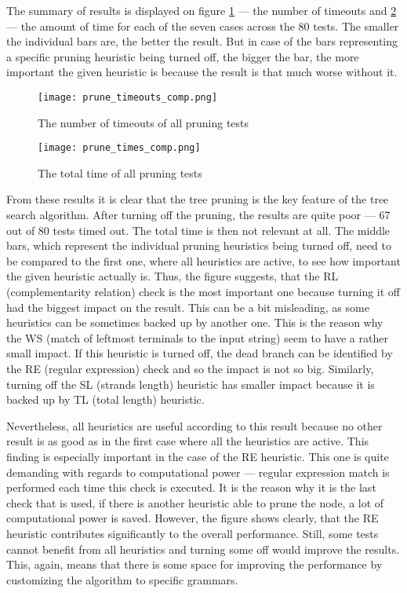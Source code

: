 The summary of results is displayed on figure \ref{fig:prune_timeouts_comp} --- the number of timeouts and \ref{fig:prune_times_comp} --- the amount of time for each of the seven cases across the 80 tests. The smaller the individual bars are, the better the result. But in case of the bars representing a specific pruning heuristic being turned off, the bigger the bar, the more important the given heuristic is because the result is that much worse without it.

\begin{figure}[h!]
  \centering
  \texttt{[image: prune\_timeouts\_comp.png]}
  \caption{The number of timeouts of all pruning tests}
  \label{fig:prune_timeouts_comp}
\end{figure}

\begin{figure}[h!]
  \centering
  \texttt{[image: prune\_times\_comp.png]}
  \caption{The total time of all pruning tests}
  \label{fig:prune_times_comp}
\end{figure}


From these results it is clear that the tree pruning is the key feature of the tree search algorithm. After turning off the pruning, the results are quite poor --- 67 out of 80 tests timed out. The total time is then not relevant at all. The middle bars, which represent the individual pruning heuristics being turned off, need to be compared to the first one, where all heuristics are active, to see how important the given heuristic actually is. Thus, the figure suggests, that the RL (complementarity relation) check is the most important one because turning it off had the biggest impact on the result. This can be a bit misleading, as some heuristics can be sometimes backed up by another one. This is the reason why the WS (match of leftmost terminals to the input string) seem to have a rather small impact. If this heuristic is turned off, the dead branch can be identified by the RE (regular expression) check and so the impact is not so big. Similarly, turning off the SL (strands length) heuristic has smaller impact because it is backed up by TL (total length) heuristic.

Nevertheless, all heuristics are useful according to this result because no other result is as good as in the first case where all the heuristics are active.  This finding is especially important in the case of the RE heuristic. This one is quite demanding with regards to computational power --- regular expression match is performed each time this check is executed. It is the reason why it is the last check that is used, if there is another heuristic able to prune the node, a lot of computational power is saved. However, the figure shows clearly, that the RE heuristic contributes significantly to the overall performance. Still, some tests cannot benefit from all heuristics and turning some off would improve the results. This, again, means that there is some space for improving the performance by customizing the algorithm to specific grammars.


